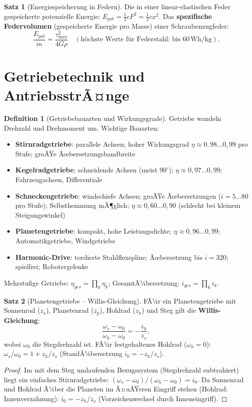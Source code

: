 ﻿\documentclass[a4paper,12pt]{report}
\theoremstyle{definition}
\newtheorem{definition}{Definition}
\newtheorem{satz}{Satz}
\begin{document}
\begin{satz}[Energiespeicherung in Federn]
Die in einer linear-elastischen Feder gespeicherte potenzielle Energie:
$E_{pot} = \tfrac{1}{2}cF^2 = \tfrac{1}{2}cx^2$.
Das \textbf{spezifische Federvolumen} (gespeicherte Energie pro Masse)
einer Schraubenzugfeder:
\[
  \frac{E_{pot}}{m} = \frac{\tau_{\max}^2}{4G\rho} \quad
  (\text{h\"ochste Werte f\"ur Federstahl: bis } 60\,\mathrm{Wh/kg}).
\]
\end{satz}


\section{Getriebetechnik und AntriebsstrÃ¤nge}

\begin{definition}[Getriebebauarten und Wirkungsgrade]
Getriebe wandeln Drehzahl und Drehmoment um. Wichtige Bauarten:
\begin{itemize}
    \item[-] \textbf{Stirnradgetriebe}: parallele Achsen; hoher Wirkungsgrad
          $\eta \approx 0{,}98\ldots0{,}99$ pro Stufe; groÃŸe Ãœbersetzungsbandbreite
    \item[-] \textbf{Kegelradgetriebe}: schneidende Achsen (meist $90^\circ$);
          $\eta \approx 0{,}97\ldots0{,}99$; Fahrzeugachsen, Differentiale
    \item[-] \textbf{Schneckengetriebe}: windschiefe Achsen; groÃŸe Ãœbersetzungen
          ($i = 5\ldots80$ pro Stufe); Selbsthemmung mÃ¶glich;
          $\eta \approx 0{,}60\ldots0{,}90$ (schlecht bei kleinem Steigungswinkel)
    \item[-] \textbf{Planetengetriebe}: kompakt, hohe Leistungsdichte;
          $\eta \approx 0{,}96\ldots0{,}99$; Automatikgetriebe, Windgetriebe
    \item[-] \textbf{Harmonic-Drive}: tordierte Stahlflexspline;
          Ãœbersetzung bis $i = 320$; spielfrei; Robotergelenke
\end{itemize}
Mehrstufige Getriebe: $\eta_{ges} = \prod_k \eta_k$;
GesamtÃ¼bersetzung: $i_{ges} = \prod_k i_k$.
\end{definition}

\begin{satz}[Planetengetriebe -- Willis-Gleichung]
FÃ¼r ein Planetengetriebe mit Sonnenrad ($z_s$), Planetenrad ($z_p$),
Hohlrad ($z_h$) und Steg gilt die \textbf{Willis-Gleichung}:
\[
  \frac{\omega_s - \omega_0}{\omega_h - \omega_0} = -\frac{z_h}{z_s},
\]
wobei $\omega_0$ die Stegdrehzahl ist. FÃ¼r festgehaltenes Hohlrad
($\omega_h = 0$): $\omega_s/\omega_0 = 1 + z_h/z_s$ (StandÃ¼bersetzung $i_0 = -z_h/z_s$).
\end{satz}
\begin{proof}
Im mit dem Steg umlaufenden Bezugssystem (Stegdrehzahl subtrahiert)
liegt ein einfaches Stirnradgetriebe: $(\omega_s - \omega_0)/(\omega_h - \omega_0) = i_0$.
Da Sonnenrad und Hohlrad Ã¼ber die Planeten im Ã¤uÃŸeren Eingriff stehen
(Hohlrad: Innenverzahnung): $i_0 = -z_h/z_s$ (Vorzeichenwechsel durch Inneneingriff).
\end{proof}
\end{document}

